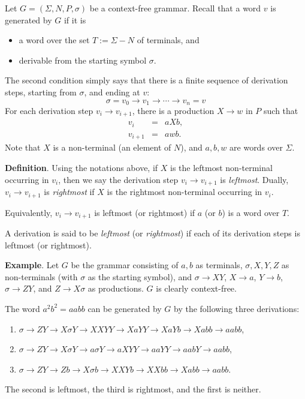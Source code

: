 \documentclass[12pt]{article}
\begin{document}
Let $G=(\Sigma, N, P, \sigma)$ be a context-free grammar.  Recall that a word $v$ is generated by $G$ if it is
\begin{itemize}
\item a word over the set $T:=\Sigma - N$ of terminals, and
\item derivable from the starting symbol $\sigma$.
\end{itemize}
The second condition simply says that there is a finite sequence of derivation steps, starting from $\sigma$, and ending at $v$:
$$\sigma = v_0 \to v_1 \to \cdots \to v_n = v$$
For each derivation step $v_i\to v_{i+1}$, there is a production $X\to w$ in $P$ such that
\begin{eqnarray*}
v_i &=& aXb, \\
v_{i+1} &=& awb.
\end{eqnarray*}
Note that $X$ is a non-terminal (an element of $N$), and $a,b,w$ are words over $\Sigma$.

\textbf{Definition}.  Using the notations above, if $X$ is the leftmost non-terminal occurring in $v_i$, then we say the derivation step $v_i\to v_{i+1}$ is \emph{leftmost}.  Dually, $v_i\to v_{i+1}$ is \emph{rightmost} if $X$ is the rightmost non-terminal occurring in $v_i$.

Equivalently, $v_i\to v_{i+1}$ is leftmost (or rightmost) if $a$ (or $b$) is a word over $T$.

A derivation is said to be \emph{leftmost} (or \emph{rightmost}) if each of its derivation steps is leftmost (or rightmost).

\textbf{Example}.  Let $G$ be the grammar consisting of $a,b$ as terminals, $\sigma,X,Y,Z$ as non-terminals (with $\sigma$ as the starting symbol), and $\sigma \to XY$, $X\to a$, $Y\to b$, $\sigma \to ZY$, and $Z\to X\sigma$ as productions.  $G$ is clearly context-free.

The word $a^2b^2=aabb$ can be generated by $G$ by the following three derivations:
\begin{enumerate}
\item $\sigma \to ZY \to X\sigma Y \to XXYY \to XaYY \to XaYb \to Xabb \to aabb$,
\item $\sigma \to ZY \to X\sigma Y \to a \sigma Y \to a XYY \to aaYY \to aabY \to aabb$,
\item $\sigma \to ZY \to Zb \to X\sigma b \to XXY b\to XXbb \to Xabb \to aabb$.
\end{enumerate}
The second is leftmost, the third is rightmost, and the first is neither.
\end{document}

